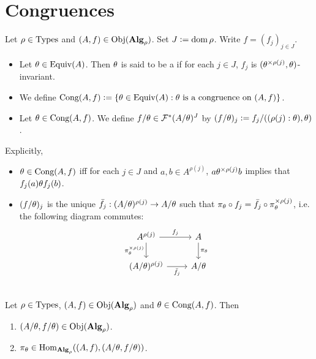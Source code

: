 \documentclass{book}
\begin{document}
\section{Congruences}

\begin{defn}
	Let $\rho \in \operatorname{Types}$ and $(A, f) \in \operatorname{Obj}(\operatorname*{\text{\textbf{Alg}}}_\rho)$. Set $J \vcentcolon= \operatorname{dom} \rho$. Write $f = (f_j)_{j \in J}$. 
	\begin{itemize}
		\item Let $\theta \in \operatorname*{\text{Equiv}}(A)$. Then $\theta$ is said to be a  if for each $j \in J$, $f_j$ is $(\theta^{\times \rho(j)}, \theta)$-invariant.
		\item We define $\operatorname*{\text{Cong}}(A,f) \vcentcolon= \{\theta \in \operatorname*{\text{Equiv}}(A): \text{$\theta$ is a congruence on $(A, f)$}\}$.
		\item Let $\theta \in \operatorname*{\text{Cong}}(A, f)$. We define $f/\theta \in \mathcal{F}^*(A/\theta)^J$ by $(f/\theta)_j \vcentcolon= f_j/((\rho(j):\theta), \theta)$.
	\end{itemize}
\end{defn}

\begin{note}
	Explicitly,
	\begin{itemize}
		\item $\theta \in \operatorname*{\text{Cong}}(A,f)$ iff for each $j \in J$ and $a, b \in A^{\rho(j)}$, $a \theta^{\times \rho(j)} b$ implies that $f_j(a) \theta f_j(b)$.
		\item $(f/\theta)_j$ is the unique $\bar{f}_j:(A/\theta)^{\rho(j)} \rightarrow A/\theta$ such that $\pi_{\theta} \circ f_j = \bar{f}_j \circ \pi_{\theta}^{\times \rho(j)}$, i.e. the following diagram commutes: 
		\[ 
		\begin{tikzcd}
			A^{\rho(j)}  \arrow[r, "f_j"]  \arrow[d, "\pi_{\th}^{\times \rho(j)}"']  & A   \arrow[d, "\pi_{\th}"]\\
			(A/\th)^{\rho(j)} \arrow[r, "\bar{f}_j"'] &  A / \th \\
		\end{tikzcd}
		\]
	\end{itemize}
\end{note}

\begin{ex}
	Let $\rho \in \operatorname{Types}$, $(A, f) \in \operatorname{Obj}(\operatorname*{\text{\textbf{Alg}}}_\rho)$ and $\theta \in \operatorname*{\text{Cong}}(A,f)$. Then 
	\begin{enumerate}
		\item $(A/\theta, f/\theta) \in \operatorname{Obj}(\operatorname*{\text{\textbf{Alg}}}_{\rho})$.  
		\item $\pi_{\theta} \in \operatorname{Hom}_{\operatorname*{\text{\textbf{Alg}}}_{\rho}}((A, f), (A/\theta, f/\theta))$.
	\end{enumerate}
\end{ex}
\end{document}
